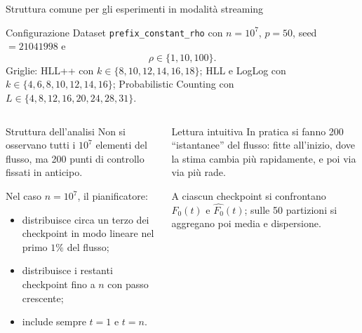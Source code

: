 \documentclass[aspectratio=169,11pt]{beamer}
\newcommand{\Fzero}{F_0}
\begin{document}
\begin{frame}[shrink=2]{Struttura comune per gli esperimenti in modalit\`a streaming}
  \begin{block}{Configurazione}
    \scriptsize
    Dataset \texttt{prefix\_constant\_rho} con \(n=10^7\), \(p=50\), seed
    \(=21041998\) e
    \[
      \rho \in \{1,10,100\}.
    \]
    Griglie: HLL++ con \(k\in\{8,10,12,14,16,18\}\); HLL e LogLog con
    \(k\in\{4,6,8,10,12,14,16\}\); Probabilistic Counting con
    \(L\in\{4,8,12,16,20,24,28,31\}\).
  \end{block}

  \begin{columns}[T,onlytextwidth]
      \begin{block}{Struttura dell'analisi}
        \scriptsize
        Non si osservano tutti i \(10^7\) elementi del flusso, ma 200 punti di
        controllo fissati in anticipo.

        Nel caso \(n=10^7\), il pianificatore:
        \begin{itemize}
          \item distribuisce circa un terzo dei checkpoint in modo lineare nel primo \(1\%\) del flusso;
          \item distribuisce i restanti checkpoint fino a \(n\) con passo crescente;
          \item include sempre \(t=1\) e \(t=n\).
        \end{itemize}
      \end{block}
      \begin{block}{Lettura intuitiva}
        \scriptsize
        In pratica si fanno 200 ``istantanee'' del flusso: fitte all'inizio,
        dove la stima cambia pi\`u rapidamente, e poi via via pi\`u rade.

        A ciascun checkpoint si confrontano \(\Fzero(t)\) e
        \(\widehat{\Fzero}(t)\); sulle 50 partizioni si aggregano poi media e
        dispersione.
      \end{block}
  \end{columns}
\end{frame}
\end{document}

